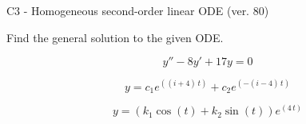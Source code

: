 \begin{exercise}
  \begin{exerciseTitle}C3 - Homogeneous second-order linear ODE (ver. 80)\end{exerciseTitle}
  \begin{exerciseStatement}
    
Find the general solution to the given ODE.

    
\[y''-8y'+17y = 0\]

  \end{exerciseStatement}
  \begin{exerciseAnswer}
    
\[y= c_{1} e^{\left(\left(i + 4\right) \, t\right)} + c_{2} e^{\left(-\left(i - 4\right) \, t\right)}\]

    
\[y= {\left(k_{1} \cos\left(t\right) + k_{2} \sin\left(t\right)\right)} e^{\left(4 \, t\right)}\]

  \end{exerciseAnswer}
\end{exercise}